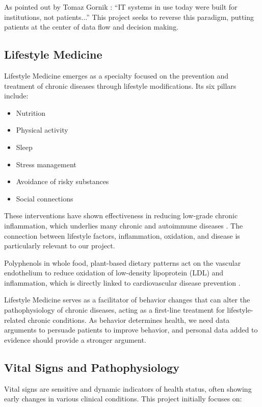As pointed out by Tomaz Gornik \cite{Gornik2021}: ``IT systems in use today were built for institutions, not patients...'' This project seeks to reverse this paradigm, putting patients at the center of data flow and decision making.

\subsection{Lifestyle Medicine}

Lifestyle Medicine emerges as a specialty focused on the prevention and treatment of chronic diseases through lifestyle modifications. Its six pillars include:

\begin{itemize}
\item Nutrition
\item Physical activity
\item Sleep
\item Stress management
\item Avoidance of risky substances
\item Social connections
\end{itemize}

These interventions have shown effectiveness in reducing low-grade chronic inflammation, which underlies many chronic and autoimmune diseases \cite{LM2023}. The connection between lifestyle factors, inflammation, oxidation, and disease is particularly relevant to our project.

Polyphenols in whole food, plant-based dietary patterns act on the vascular endothelium to reduce oxidation of low-density lipoprotein (LDL) and inflammation, which is directly linked to cardiovascular disease prevention \cite{IBLM2023}.

Lifestyle Medicine serves as a facilitator of behavior changes that can alter the pathophysiology of chronic diseases, acting as a first-line treatment for lifestyle-related chronic conditions. As behavior determines health, we need data arguments to persuade patients to improve behavior, and personal data added to evidence should provide a stronger argument.

\subsection{Vital Signs and Pathophysiology}

Vital signs are sensitive and dynamic indicators of health status, often showing early changes in various clinical conditions. This project initially focuses on:

